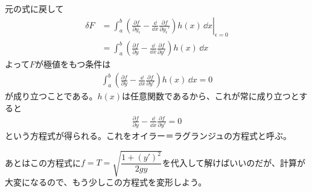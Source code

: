元の式に戻して
\begin{align*}
  \delta F &= \left. \int_a^b \left( \frac{\partial f}{\partial y_\epsilon} - \frac{\dd}{\dd x}\frac{\partial f}{\partial y_\epsilon'} \right)h(x) \,\dd x \right|_{\epsilon = 0} \\
  &= \int_a^b \left( \frac{\partial f}{\partial y} - \frac{\dd}{\dd x}\frac{\partial f}{\partial y'} \right)h(x) \,\dd x
\end{align*}
よって$F$が極値をもつ条件は
\begin{align*}
  \int_a^b \left( \frac{\partial f}{\partial y} - \frac{\dd}{\dd x}\frac{\partial f}{\partial y'} \right)h(x) \,\dd x = 0
\end{align*}
が成り立つことである。$h(x)$は任意関数であるから、これが常に成り立つとすると
\begin{align*}
  \frac{\partial f}{\partial y} - \frac{\dd}{\dd x}\frac{\partial f}{\partial y'} = 0
\end{align*}
という方程式が得られる。これをオイラー＝ラグランジュの方程式と呼ぶ。\par
あとはこの方程式に$f = T = \sqrt{\dfrac{1 + (y')^2}{2gy}}$を代入して解けばいいのだが、計算が大変になるので、もう少しこの方程式を変形しよう。

